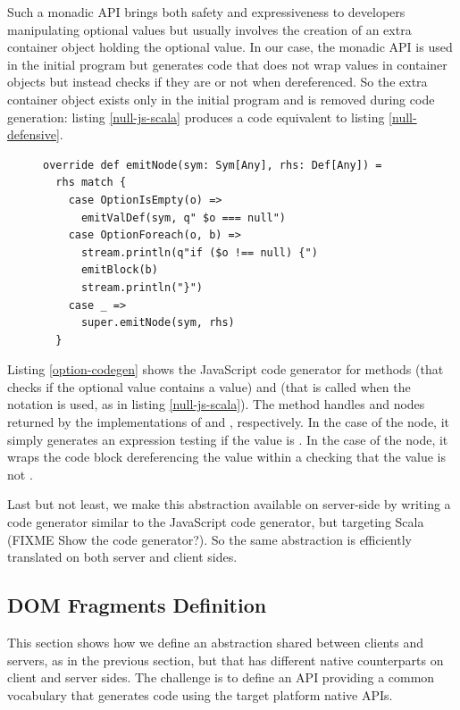 \documentclass[preprint]{sigplanconf}
\begin{document}
Such a monadic API brings both safety and expressiveness to developers manipulating optional values but usually
involves the creation of an extra container object holding the optional value. In our case, the monadic API is
used in the initial program but generates code that does not wrap values in container objects but instead checks if
they are  or not when dereferenced. So the extra container object exists only in the initial program and
is removed during code generation: listing \ref{null-js-scala} produces a code equivalent to listing
\ref{null-defensive}.

\begin{figure}
\begin{lstlisting}[caption=JavaScript code generator for null references handling DSL,label=option-codegen]
override def emitNode(sym: Sym[Any], rhs: Def[Any]) =
  rhs match {
    case OptionIsEmpty(o) =>
      emitValDef(sym, q" $o === null")
    case OptionForeach(o, b) =>
      stream.println(q"if ($o !== null) {")
      emitBlock(b)
      stream.println("}")
    case _ =>
      super.emitNode(sym, rhs)
  }
\end{lstlisting}
\end{figure}

Listing \ref{option-codegen} shows the JavaScript code generator for methods  (that checks if the
optional value contains a value) and  (that is called when the  notation is used, as in
listing \ref{null-js-scala}). The  method handles  and  nodes
returned by the implementations of  and , respectively. In the case of the
 node, it simply generates an expression testing if the value is . In the case of the
 node, it wraps the code block dereferencing the value within a  checking that the value
is not .

Last but not least, we make this abstraction available on server-side by writing a code generator similar to the
JavaScript code generator, but targeting Scala (FIXME Show the code generator?). So the same abstraction is
efficiently translated on both server and client sides.

\subsection{DOM Fragments Definition}

This section shows how we define an abstraction shared between clients and servers, as in the previous section, but
that has different native counterparts on client and server sides. The challenge is to define an API providing a
common vocabulary that generates code using the target platform native APIs.
\end{document}
